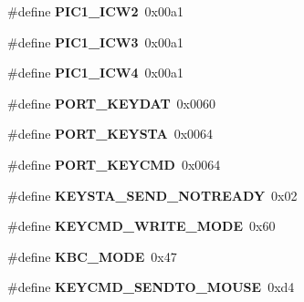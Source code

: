 \begin{DoxyCompactItemize}
\item 
\hypertarget{group__hal_gaf24f58d2f0bd1231506ed65caa0b9e6b}{}\#define {\bfseries P\+I\+C1\+\_\+\+I\+C\+W2}~0x00a1\label{group__hal_gaf24f58d2f0bd1231506ed65caa0b9e6b}

\item 
\hypertarget{group__hal_ga9ba782100f085a722f323d6f4f5f96f9}{}\#define {\bfseries P\+I\+C1\+\_\+\+I\+C\+W3}~0x00a1\label{group__hal_ga9ba782100f085a722f323d6f4f5f96f9}

\item 
\hypertarget{group__hal_ga32cc107ef3e1d0e2daaf9775c4bd30e6}{}\#define {\bfseries P\+I\+C1\+\_\+\+I\+C\+W4}~0x00a1\label{group__hal_ga32cc107ef3e1d0e2daaf9775c4bd30e6}

\item 
\hypertarget{group__hal_ga26e8797f8769f99f2e3d1d23807b9681}{}\#define {\bfseries P\+O\+R\+T\+\_\+\+K\+E\+Y\+D\+A\+T}~0x0060\label{group__hal_ga26e8797f8769f99f2e3d1d23807b9681}

\item 
\hypertarget{group__hal_gaecbeb49435311e470e44e1ef33e1e0dc}{}\#define {\bfseries P\+O\+R\+T\+\_\+\+K\+E\+Y\+S\+T\+A}~0x0064\label{group__hal_gaecbeb49435311e470e44e1ef33e1e0dc}

\item 
\hypertarget{group__hal_ga4284ba61f1d5d637083da21127ee4bff}{}\#define {\bfseries P\+O\+R\+T\+\_\+\+K\+E\+Y\+C\+M\+D}~0x0064\label{group__hal_ga4284ba61f1d5d637083da21127ee4bff}

\item 
\hypertarget{group__hal_ga76542314fe11eb39b22f93ff8187b08f}{}\#define {\bfseries K\+E\+Y\+S\+T\+A\+\_\+\+S\+E\+N\+D\+\_\+\+N\+O\+T\+R\+E\+A\+D\+Y}~0x02\label{group__hal_ga76542314fe11eb39b22f93ff8187b08f}

\item 
\hypertarget{group__hal_ga1c7cab517e1c1b2f4c280715c07d6df2}{}\#define {\bfseries K\+E\+Y\+C\+M\+D\+\_\+\+W\+R\+I\+T\+E\+\_\+\+M\+O\+D\+E}~0x60\label{group__hal_ga1c7cab517e1c1b2f4c280715c07d6df2}

\item 
\hypertarget{group__hal_ga4b408031943644b59d1a7f94218477b6}{}\#define {\bfseries K\+B\+C\+\_\+\+M\+O\+D\+E}~0x47\label{group__hal_ga4b408031943644b59d1a7f94218477b6}

\item 
\hypertarget{group__hal_ga57804c5d20761a9c150e76e4007e88e0}{}\#define {\bfseries K\+E\+Y\+C\+M\+D\+\_\+\+S\+E\+N\+D\+T\+O\+\_\+\+M\+O\+U\+S\+E}~0xd4\label{group__hal_ga57804c5d20761a9c150e76e4007e88e0}


\end{DoxyCompactItemize}
